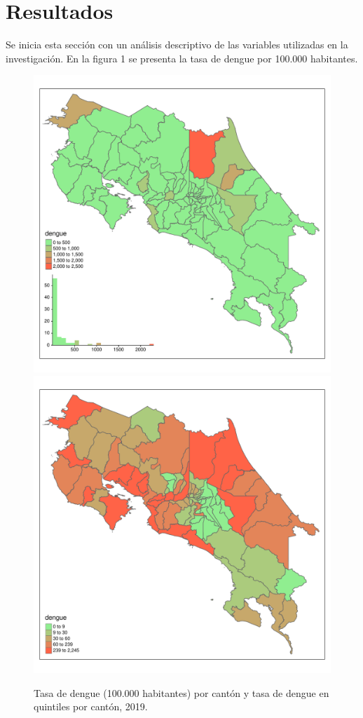 \documentclass[a4paper,12pt]{report}
\begin{document}
\section*{Resultados}
Se inicia esta sección con un análisis descriptivo de las variables utilizadas en la investigación. En la figura 1 se presenta la tasa de dengue por 100.000 habitantes.  

\begin{figure}[h!]
\centering
\includegraphics[width=.48\textwidth]{F11.pdf}
\includegraphics[width=.48\textwidth]{F12.pdf}
\caption{Tasa de dengue (100.000 habitantes) por cantón y tasa de dengue en quintiles por cantón, 2019.}
\end{figure}
\end{document}
